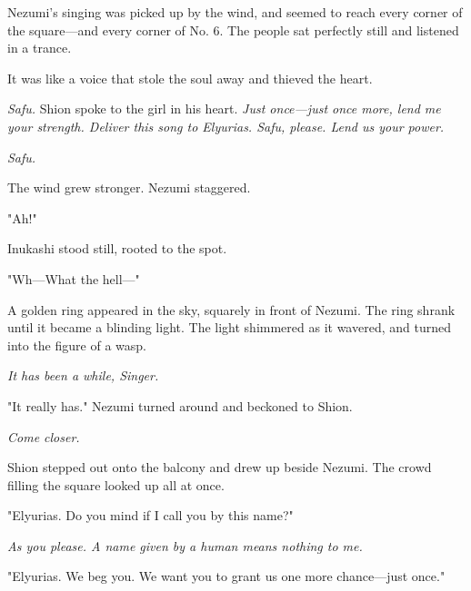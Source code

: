 Nezumi's singing was picked up by the wind, and seemed to reach every
corner of the square---and every corner of No. 6. The people sat perfectly
still and listened in a trance.

It was like a voice that stole the soul away and thieved the heart.

\myspace

\emph{Safu.} Shion spoke to the girl in his heart. \emph{Just once---just once more,
lend me your strength. Deliver this song to Elyurias. Safu, please. Lend
us your power.}


\emph{Safu.}

\myspace

The wind grew stronger. Nezumi staggered.

"Ah!"

Inukashi stood still, rooted to the spot.

"Wh---What the hell---"

A golden ring appeared in the sky, squarely in front of Nezumi. The ring
shrank until it became a blinding light. The light shimmered as it
wavered, and turned into the figure of a wasp.

\myspace

\emph{It has been a while, Singer.}

\myspace

"It really has." Nezumi turned around and beckoned to Shion.

\myspace

\emph{Come closer.}

\myspace

Shion stepped out onto the balcony and drew up beside Nezumi. The crowd
filling the square looked up all at once.

"Elyurias. Do you mind if I call you by this name?"

\myspace

\emph{As you please. A name given by a human means nothing to me.}

\myspace

"Elyurias. We beg you. We want you to grant us one more chance---just
once."

